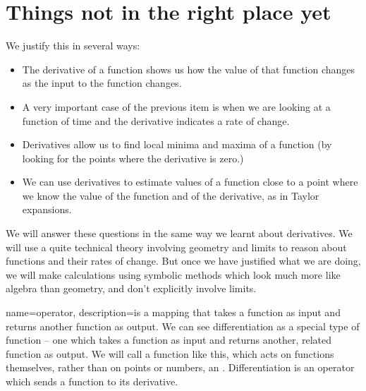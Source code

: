 \section{Things not in the right place yet}

 We justify this in several ways:
\begin{itemize}
\item The derivative of a function shows us how the value of that function changes as the input to the function changes. 
\item A very important case of the previous item is when we are looking at a function of time and the derivative indicates a rate of change.
\item Derivatives allow us to find local minima and maxima of a function (by looking for the points where the derivative is zero.)
\item We can use derivatives to estimate values of a function close to a point where we know the value of the function and of the derivative, as in Taylor expansions.
\end{itemize}

We will answer these questions in the same way we learnt about derivatives. We will use a quite technical theory involving geometry and limits to reason about functions and their rates of change. But once we have justified what we are doing, we will make calculations using symbolic methods which look much more like algebra than geometry, and don't explicitly involve limits.

{
	name=operator,
	description={is a mapping that takes a function as input and returns another function as output.}
}
We can see differentiation as a special type of function -- one which takes a function as input and returns another, related function as output. We will call a function like this, which acts on functions themselves, rather than on points or numbers, an . Differentiation is an operator which sends a function to its derivative. 
